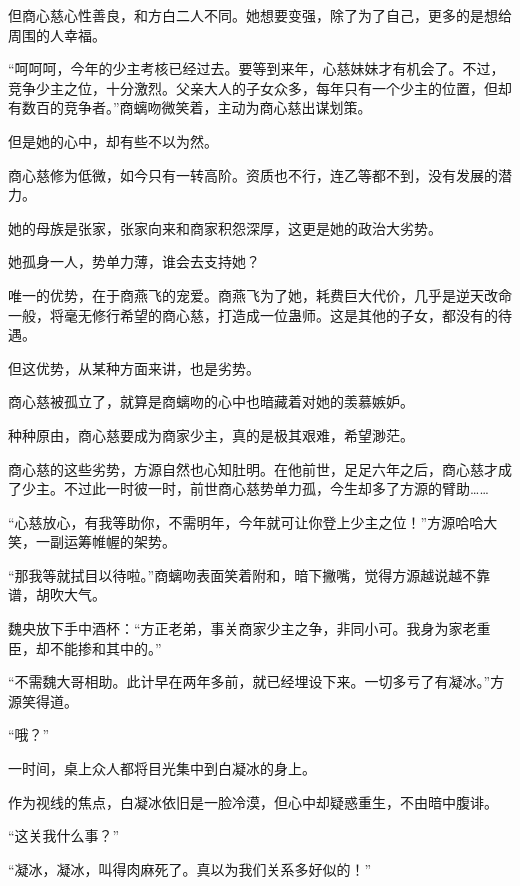\begin{this_body}
但商心慈心性善良，和方白二人不同。她想要变强，除了为了自己，更多的是想给周围的人幸福。

“呵呵呵，今年的少主考核已经过去。要等到来年，心慈妹妹才有机会了。不过，竞争少主之位，十分激烈。父亲大人的子女众多，每年只有一个少主的位置，但却有数百的竞争者。”商螭吻微笑着，主动为商心慈出谋划策。

但是她的心中，却有些不以为然。

商心慈修为低微，如今只有一转高阶。资质也不行，连乙等都不到，没有发展的潜力。

她的母族是张家，张家向来和商家积怨深厚，这更是她的政治大劣势。

她孤身一人，势单力薄，谁会去支持她？

唯一的优势，在于商燕飞的宠爱。商燕飞为了她，耗费巨大代价，几乎是逆天改命一般，将毫无修行希望的商心慈，打造成一位蛊师。这是其他的子女，都没有的待遇。

但这优势，从某种方面来讲，也是劣势。

商心慈被孤立了，就算是商螭吻的心中也暗藏着对她的羡慕嫉妒。

种种原由，商心慈要成为商家少主，真的是极其艰难，希望渺茫。

商心慈的这些劣势，方源自然也心知肚明。在他前世，足足六年之后，商心慈才成了少主。不过此一时彼一时，前世商心慈势单力孤，今生却多了方源的臂助……

“心慈放心，有我等助你，不需明年，今年就可让你登上少主之位！”方源哈哈大笑，一副运筹帷幄的架势。

“那我等就拭目以待啦。”商螭吻表面笑着附和，暗下撇嘴，觉得方源越说越不靠谱，胡吹大气。

魏央放下手中酒杯：“方正老弟，事关商家少主之争，非同小可。我身为家老重臣，却不能掺和其中的。”

“不需魏大哥相助。此计早在两年多前，就已经埋设下来。一切多亏了有凝冰。”方源笑得道。

“哦？”

一时间，桌上众人都将目光集中到白凝冰的身上。

作为视线的焦点，白凝冰依旧是一脸冷漠，但心中却疑惑重生，不由暗中腹诽。

“这关我什么事？”

“凝冰，凝冰，叫得肉麻死了。真以为我们关系多好似的！”

\end{this_body}

